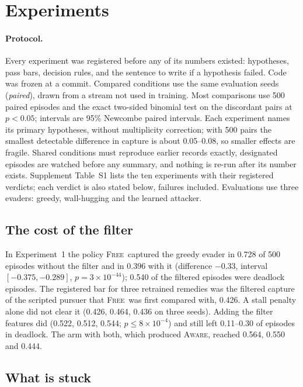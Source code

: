 \documentclass{l4dc2027}
\newcommand{\Free}{\textsc{Free}}
\newcommand{\Aware}{\textsc{Aware}}
\begin{document}
\section{Experiments}\label{sec:experiments}

\paragraph{Protocol.} Every experiment was registered before any of its numbers existed: hypotheses, pass bars, decision rules, and the sentence to write if a hypothesis failed. Code was frozen at a commit. Compared conditions use the same evaluation seeds (\emph{paired}), drawn from a stream not used in training. Most comparisons use 500 paired episodes and the exact two-sided binomial test on the discordant pairs at $p < 0.05$; intervals are 95\% Newcombe paired intervals. Each experiment names its primary hypotheses, without multiplicity correction; with 500 pairs the smallest detectable difference in capture is about 0.05--0.08, so smaller effects are fragile. Shared conditions must reproduce earlier records exactly, designated episodes are watched before any summary, and nothing is re-run after its number exists. Supplement Table~S1 lists the ten experiments with their registered verdicts; each verdict is also stated below, failures included. Evaluations use three evaders: greedy, wall-hugging and the learned attacker.


\subsection{The cost of the filter}\label{sec:cost}

In Experiment~1 the policy \Free\ captured the greedy evader in 0.728 of 500 episodes without the filter and in 0.396 with it (difference $-0.33$, interval $[-0.375, -0.289]$, $p = 3\times10^{-44}$); 0.540 of the filtered episodes were deadlock episodes. The registered bar for three retrained remedies was the filtered capture of the scripted pursuer that \Free\ was first compared with, 0.426. A stall penalty alone did not clear it (0.426, 0.464, 0.436 on three seeds). Adding the filter features did (0.522, 0.512, 0.544; $p \le 8\times10^{-4}$) and still left 0.11--0.30 of episodes in deadlock. The arm with both, which produced \Aware, reached 0.564, 0.550 and 0.444.

\subsection{What is stuck}\label{sec:stuck}
\end{document}
